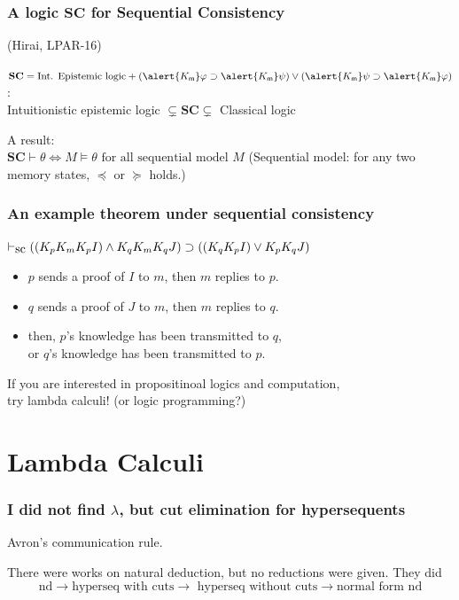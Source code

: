 \documentclass[slidestop,compress,mathserif]{beamer}
\begin{document}
\begin{frame}
 \frametitle{A logic $\mathbf{SC}$ for Sequential Consistency}
   (Hirai, LPAR-16)

 $\mathbf{SC} = \text{Int. {Epistemic} logic}
 + (\alert{K_\memory}\varphi\supset \alert{K_\memory}\psi)\vee
 (\alert{K_\memory}\psi\supset \alert{K_\memory}\varphi)$:\\
 \hskip 2cm Intuitionistic epistemic logic $\subsetneq \mathbf{SC} \subsetneq $ Classical logic

 \vfill
A result:\\
\hskip 2cm $\mathbf{SC}
 \vdash \theta \Longleftrightarrow M\models \theta \text{ for all sequential model }M$
 \vfill
 (Sequential model: for any two \alert{memory states}, $\preceq$ or $\succeq$ holds.)
\end{frame}

 \begin{frame}
\frametitle{An example theorem under sequential consistency} 

 $\vdash_{\mbox{\rm sc}} ((K_p K_m K_p I) \wedge K_q K_m K_q J) \supset 
 ((K_q K_p I) \vee K_p K_q J)$

\vskip 7mm

\begin{itemize}
 \item $p$ sends a proof of $I$ to $m$, then $m$ replies to $p$.
 \item $q$ sends a proof of $J$ to $m$, then $m$ replies to $q$.
 \item then, $p$'s knowledge has been transmitted to $q$,\\
       or $q$'s knowledge has been transmitted to $p$.
\end{itemize}
\end{frame}

  \begin{frame}
   \vfill
   If you are interested in propositinoal logics and computation,\\
   try lambda calculi!  (or logic programming?)
   \vfill
  \end{frame}

  \section{Lambda Calculi}

  \begin{frame}
   \frametitle{I did not find $\lambda$, but cut elimination for
   hypersequents}

   Avron's communication rule.


   \vfill
   There were works on natural deduction, but no reductions were given.
   They did
   \[
    \text{nd} \rightarrow \text{hyperseq
   with cuts} \rightarrow \text{ hyperseq without cuts} \rightarrow
   \text{normal form nd}
   \]
   \vfill
  \end{frame}
\end{document}
